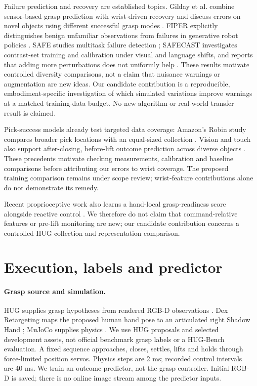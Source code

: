 \documentclass[10pt,letterpaper]{article}
\begin{document}
Failure prediction and recovery are established topics. Gilday et al. combine
sensor-based grasp prediction with wrist-driven recovery and discuss errors on
novel objects using different successful grasp modes \cite{gilday}. FIPER
explicitly distinguishes benign unfamiliar observations from failures in
generative robot policies \cite{fiper}. SAFE studies multitask failure detection
\cite{safe}; SAFECAST investigates contrast-set training and calibration under
visual and language shifts, and reports that adding more perturbations does
not uniformly help \cite{safecast}. These results motivate controlled diversity
comparisons, not a claim that nuisance warnings or augmentation are new ideas.
Our candidate contribution is a reproducible, embodiment-specific investigation
of which simulated variations improve warnings at a matched training-data
budget. No new algorithm or real-world transfer result is claimed.

Pick-success models already test targeted data coverage: Amazon's Robin study
compares broader pick locations with an equal-sized collection
\cite{robin}. Vision and touch also support after-closing, before-lift outcome
prediction across diverse objects \cite{calandra}. These precedents motivate
checking measurements, calibration and baseline comparisons before attributing
our errors to wrist coverage. The proposed training comparison remains under
scope review; wrist-feature contributions alone do not demonstrate its remedy.

Recent proprioceptive work also learns a hand-local grasp-readiness score
alongside reactive control \cite{blindreflex}. We therefore do not claim that
command-relative features or pre-lift monitoring are new; our candidate
contribution concerns a controlled HUG collection and representation comparison.

\section{Execution, labels and predictor}
\paragraph{Grasp source and simulation.}
HUG supplies grasp hypotheses from rendered RGB-D observations \cite{hug}.
Dex Retargeting maps the proposed human hand pose to an articulated right
Shadow Hand \cite{dex}; MuJoCo supplies physics \cite{mujoco}. We use HUG
proposals and selected development assets, not official benchmark grasp labels
or a HUG-Bench evaluation. A fixed sequence approaches, closes, settles, lifts
and holds through force-limited position servos. Physics steps are 2 ms;
recorded control intervals are 40 ms. We train an outcome predictor, not the
grasp controller. Initial RGB-D is saved; there is no online image stream among
the predictor inputs.
\end{document}
